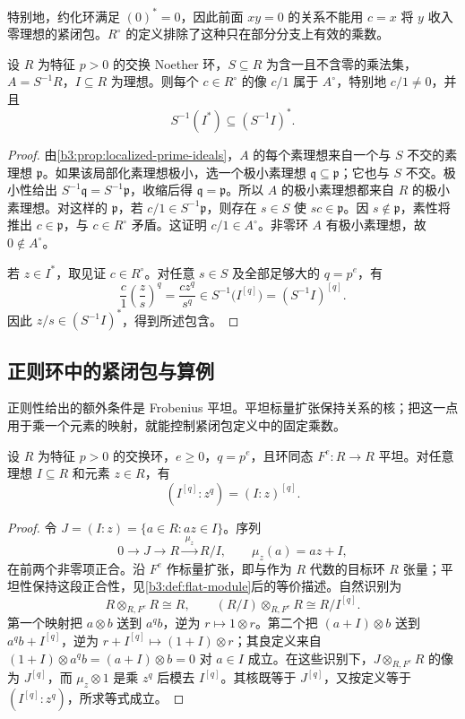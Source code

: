 特别地，约化环满足 \((0)^*=0\)，因此前面 \(xy=0\) 的关系不能用 \(c=x\) 将 \(y\) 收入零理想的紧闭包。\(R^\circ\) 的定义排除了这种只在部分分支上有效的乘数。

\begin{lemma}\label{b3:lem:C-tight-localization}
	设 \(R\) 为特征 \(p>0\) 的交换 Noether 环，\(S\subseteq R\) 为含一且不含零的乘法集，\(A=S^{-1}R\)，\(I\subseteq R\) 为理想。则每个 \(c\in R^\circ\) 的像 \(c/1\) 属于 \(A^\circ\)，特别地 \(c/1\ne0\)，并且
	\[
		S^{-1}(I^*)\subseteq(S^{-1}I)^*.
	\]
\end{lemma}
\begin{proof}
	由\cref{b3:prop:localized-prime-ideals}，\(A\) 的每个素理想来自一个与 \(S\) 不交的素理想 \(\mathfrak p\)。如果该局部化素理想极小，选一个极小素理想 \(\mathfrak q\subseteq\mathfrak p\)；它也与 \(S\) 不交。极小性给出 \(S^{-1}\mathfrak q=S^{-1}\mathfrak p\)，收缩后得 \(\mathfrak q=\mathfrak p\)。所以 \(A\) 的极小素理想都来自 \(R\) 的极小素理想。对这样的 \(\mathfrak p\)，若 \(c/1\in S^{-1}\mathfrak p\)，则存在 \(s\in S\) 使 \(sc\in\mathfrak p\)。因 \(s\notin\mathfrak p\)，素性将推出 \(c\in\mathfrak p\)，与 \(c\in R^\circ\) 矛盾。这证明 \(c/1\in A^\circ\)。非零环 \(A\) 有极小素理想，故 \(0\notin A^\circ\)。

	若 \(z\in I^*\)，取见证 \(c\in R^\circ\)。对任意 \(s\in S\) 及全部足够大的 \(q=p^e\)，有
	\[
		\dfrac c1\left(\dfrac zs\right)^q
		=\dfrac{cz^q}{s^q}\in S^{-1}\bigl(I^{[q]}\bigr)
		=(S^{-1}I)^{[q]}.
	\]
	因此 \(z/s\in(S^{-1}I)^*\)，得到所述包含。
\end{proof}

\subsection{正则环中的紧闭包与算例}
\label{b3:subsec:C05:02}

正则性给出的额外条件是 Frobenius 平坦。平坦标量扩张保持关系的核；把这一点用于乘一个元素的映射，就能控制紧闭包定义中的固定乘数。

\begin{lemma}\label{b3:lem:C-flat-frobenius-colon}
	设 \(R\) 为特征 \(p>0\) 的交换环，\(e\ge0\)，\(q=p^e\)，且环同态 \(F^e:R\rightarrow R\) 平坦。对任意理想 \(I\subseteq R\) 和元素 \(z\in R\)，有
	\[
		(I^{[q]}:z^q)=(I:z)^{[q]}.
	\]
\end{lemma}
\begin{proof}
	令 \(J=(I:z)=\{a\in R:az\in I\}\)。序列
	\[
		0\longrightarrow J\longrightarrow R
		\xrightarrow{\;\mu_z\;}R/I,
		\qquad \mu_z(a)=az+I,
	\]
	在前两个非零项正合。沿 \(F^e\) 作标量扩张，即与作为 \(R\) 代数的目标环 \(R\) 张量；平坦性保持这段正合性，见\cref{b3:def:flat-module}后的等价描述。自然识别为
	\[
		R\otimes_{R,F^e}R\cong R,\qquad
		(R/I)\otimes_{R,F^e}R\cong R/I^{[q]}.
	\]
	第一个映射把 \(a\otimes b\) 送到 \(a^q b\)，逆为 \(r\mapsto1\otimes r\)。第二个把 \((a+I)\otimes b\) 送到 \(a^q b+I^{[q]}\)，逆为 \(r+I^{[q]}\mapsto(1+I)\otimes r\)；其良定义来自 \((1+I)\otimes a^q b=(a+I)\otimes b=0\) 对 \(a\in I\) 成立。在这些识别下，\(J\otimes_{R,F^e}R\) 的像为 \(J^{[q]}\)，而 \(\mu_z\otimes1\) 是乘 \(z^q\) 后模去 \(I^{[q]}\)。其核既等于 \(J^{[q]}\)，又按定义等于 \((I^{[q]}:z^q)\)，所求等式成立。
\end{proof}

